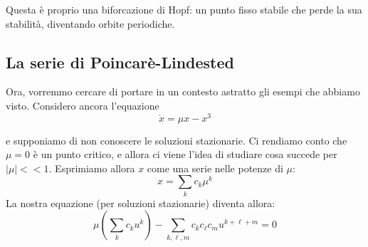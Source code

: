 \documentclass{report}
\begin{document}
\begin{example}
\begin{center}
    \end{center}

    Questa è proprio una biforcazione di Hopf: un punto fisso stabile che perde la sua stabilità, diventando orbite periodiche. \\
\end{example}

\subsection{La serie di Poincarè-Lindested}

Ora, vorremmo cercare di portare in un contesto astratto gli esempi che abbiamo visto. Considero ancora l'equazione 
\begin{equation}
    \dot{x} = \mu x- x^3
\end{equation}

e supponiamo di non conoscere le soluzioni stazionarie. Ci rendiamo conto che $\mu=0$ è un punto critico, e allora ci viene l'idea di studiare cosa succede per $|\mu| <<1$. Esprimiamo allora $x$ come una serie nelle potenze di $\mu$: 
\begin{equation}
    x = \sum_k c_k \mu^k
\end{equation}
La nostra equazione (per soluzioni stazionarie) diventa allora:  
\begin{equation}
    \mu \left(\sum_k c_k u^k \right) - \sum_{k, \ell, m} c_k c_\ell c_m u^{k+\ell+m} =0
\end{equation}
\end{document}
